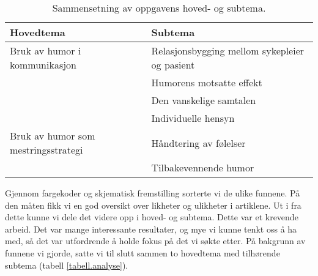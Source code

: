 \begin{table}
  \centering
  \small
  \begin{tabular}{@{}ll@{}}
    \toprule
    \textbf{Hovedtema} & \textbf{Subtema} \\
    \midrule
    Bruk av humor i kommunikasjon
      & Relasjonsbygging mellom sykepleier og pasient \\
      & Humorens motsatte effekt \\
      & Den vanskelige samtalen \\
      & Individuelle hensyn \\
    \midrule
    Bruk av humor som mestringsstrategi
      & Håndtering av følelser \\
      & Tilbakevennende humor \\
    \bottomrule
  \end{tabular}
  \label{tabell.analyse}
  \caption{Sammensetning av oppgavens hoved- og subtema.}
\end{table}

Gjennom fargekoder og skjematisk fremstilling sorterte vi de ulike funnene. På
den måten fikk vi en god oversikt over likheter og ulikheter i artiklene. Ut i
fra dette kunne vi dele det videre opp i hoved- og subtema. Dette var et
krevende arbeid. Det var mange interessante resultater, og mye vi kunne tenkt
oss å ha med, så det var utfordrende å holde fokus på det vi søkte etter. På
bakgrunn av funnene vi gjorde, satte vi til slutt sammen to hovedtema med
tilhørende subtema (tabell \vref{tabell.analyse}).
